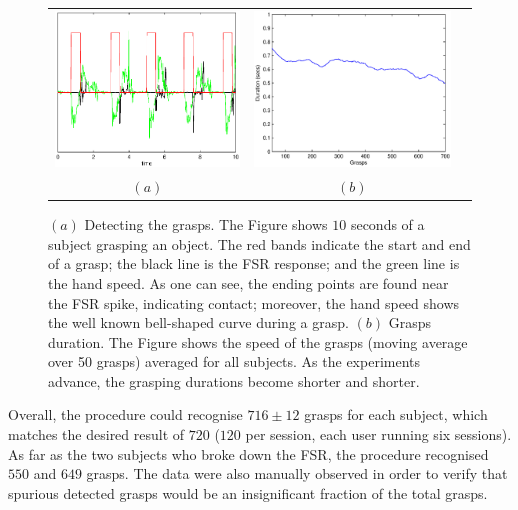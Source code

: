 \begin{figure}[htbp]
  \begin{center}
    \begin{tabular}{ccc}
      \includegraphics[width=0.48\linewidth]{grasp_seq_scotch.eps} &
      \includegraphics[width=0.48\linewidth]{grasp_trend.eps} \\
      $(a)$ & $(b)$
    \end{tabular}
    \caption{$(a)$ Detecting the grasps. The Figure shows $10$ seconds
    of a subject grasping an object. The red bands indicate the
    start and end of a grasp; the black line is the FSR response; and
    the green line is the hand speed. As one can see, the ending
    points are found near the FSR spike, indicating contact; moreover,
    the hand speed shows the well known bell-shaped curve during a
    grasp. $(b)$ Grasps duration. The Figure shows the speed of the grasps
    (moving average over 50 grasps) averaged for all subjects. As the
    experiments advance, the grasping durations become shorter and
    shorter.}
    \label{fig:grasp_sequence}
  \end{center}
\end{figure}

Overall, the procedure could recognise $716 \pm 12$ grasps for each
subject, which matches the desired result of $720$ ($120$ per session,
each user running six sessions). As far as the two subjects who broke
down the FSR, the procedure recognised $550$ and $649$ grasps. The
data were also manually observed in order to verify that spurious
detected grasps would be an insignificant fraction of the total
grasps.

